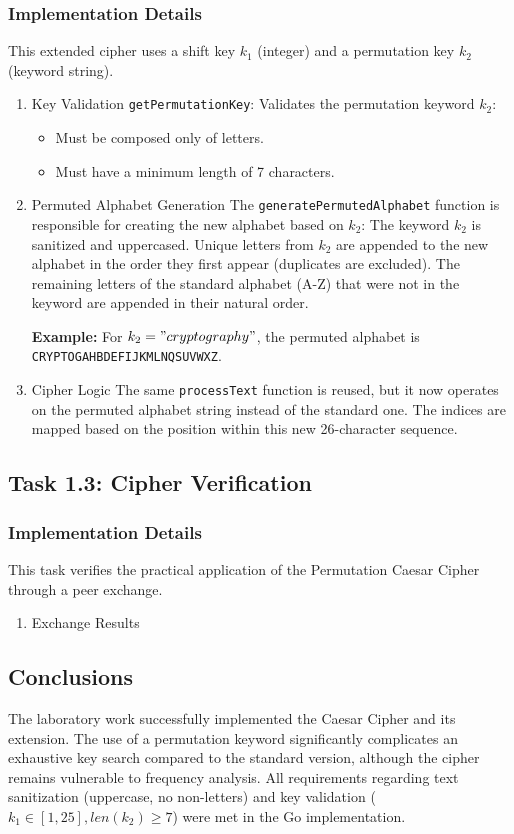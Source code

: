 \documentclass[a4paper,12pt]{article}
\begin{document}
\subsubsection{Implementation Details}
\label{sec:org4a46120}
This extended cipher uses a shift key \(k_{1}\) (integer) and a permutation key \(k_{2}\) (keyword string).
\begin{enumerate}
\item Key Validation
\label{sec:org8b29791}
\texttt{getPermutationKey}: Validates the permutation keyword \(k_{2}\):
\begin{itemize}
\item Must be composed only of letters.
\item Must have a minimum length of 7 characters.
\end{itemize}
\item Permuted Alphabet Generation
\label{sec:org431c71d}
The \texttt{generatePermutedAlphabet} function is responsible for creating the new alphabet based on \(k_{2}\):
The keyword \(k_{2}\) is sanitized and uppercased.
Unique letters from \(k_{2}\) are appended to the new alphabet in the order they first appear (duplicates are excluded).
The remaining letters of the standard alphabet (A-Z) that were not in the keyword are appended in their natural order.

\textbf{Example:} For \(k_{2}="cryptography"\), the permuted alphabet is \texttt{CRYPTOGAHBDEFIJKMLNQSUVWXZ}.
\item Cipher Logic
\label{sec:org3018471}
The same \texttt{processText} function is reused, but it now operates on the permuted alphabet string instead of the standard one. The indices are mapped based on the position within this new 26-character sequence.
\end{enumerate}
\subsection{Task 1.3: Cipher Verification}
\label{sec:orgb621f53}

\subsubsection{Implementation Details}
\label{sec:org7369653}
This task verifies the practical application of the Permutation Caesar Cipher through a peer exchange.
\begin{enumerate}
\item Exchange Results
\label{sec:orgceaa041}
\end{enumerate}
\subsection{Conclusions}
\label{sec:org61aee32}
The laboratory work successfully implemented the Caesar Cipher and its extension. The use of a permutation keyword significantly complicates an exhaustive key search compared to the standard version, although the cipher remains vulnerable to frequency analysis. All requirements regarding text sanitization (uppercase, no non-letters) and key validation (\(k_{1}\in[1,25], len(k_{2})\ge7\)) were met in the Go implementation.
\end{document}
